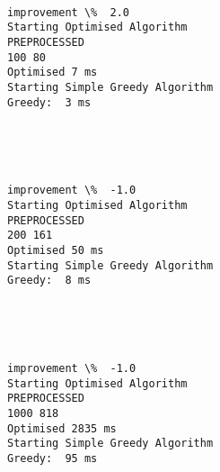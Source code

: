 \documentclass[11pt]{article}
\begin{document}
    \begin{center}
    \end{center}
    { \hspace*{\fill} \\}
    
    \begin{Verbatim}[commandchars=\\\{\}]
improvement \%  2.0
Starting Optimised Algorithm
PREPROCESSED
100 80
Optimised 7 ms
Starting Simple Greedy Algorithm
Greedy:  3 ms

    \end{Verbatim}

    \begin{center}
    \end{center}
    { \hspace*{\fill} \\}
    
    \begin{center}
    \end{center}
    { \hspace*{\fill} \\}
    
    \begin{Verbatim}[commandchars=\\\{\}]
improvement \%  -1.0
Starting Optimised Algorithm
PREPROCESSED
200 161
Optimised 50 ms
Starting Simple Greedy Algorithm
Greedy:  8 ms

    \end{Verbatim}

    \begin{center}
    \end{center}
    { \hspace*{\fill} \\}
    
    \begin{center}
    \end{center}
    { \hspace*{\fill} \\}
    
    \begin{Verbatim}[commandchars=\\\{\}]
improvement \%  -1.0
Starting Optimised Algorithm
PREPROCESSED
1000 818
Optimised 2835 ms
Starting Simple Greedy Algorithm
Greedy:  95 ms

    \end{Verbatim}
\end{document}
